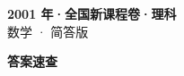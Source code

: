 \documentclass[zihao=-4, a4paper]{ctexart}
\begin{document}
\begin{center}
  {\Large\bfseries 2001 年·全国新课程卷·理科}\\[4pt]
  {\large 数学 · 简答版}
\end{center}
\medskip
{}

\clearpage
{}
\begin{center}{\Large\bfseries 答案速查}\end{center}
\medskip

\end{document}
